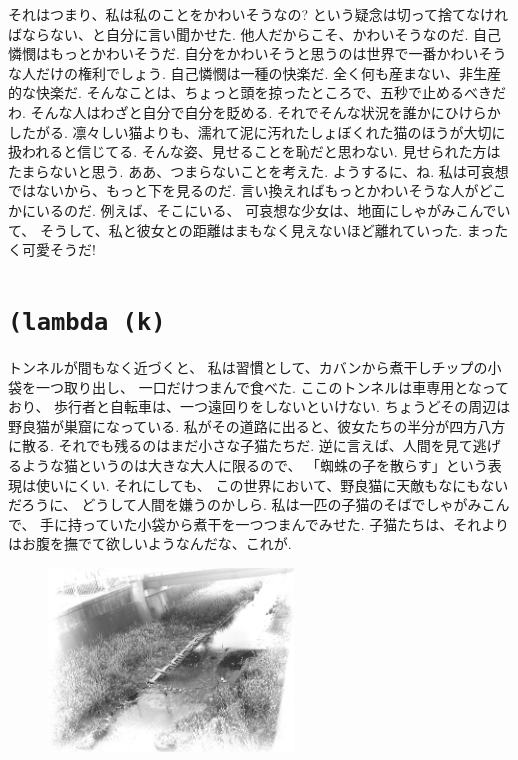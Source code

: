 それはつまり、私は私のことをかわいそうなの?
という疑念は切って捨てなければならない、と自分に言い聞かせた.
他人だからこそ、かわいそうなのだ. 自己憐憫はもっとかわいそうだ.
自分をかわいそうと思うのは世界で一番かわいそうな人だけの権利でしょう.
自己憐憫は一種の快楽だ. 全く何も産まない、非生産的な快楽だ.
そんなことは、ちょっと頭を掠ったところで、五秒で止めるべきだわ.
そんな人はわざと自分で自分を貶める.
それでそんな状況を誰かにひけらかしたがる.
凛々しい猫よりも、濡れて泥に汚れたしょぼくれた猫のほうが大切に扱われると信じてる.
そんな姿、見せることを恥だと思わない. 見せられた方はたまらないと思う.
ああ、つまらないことを考えた. ようするに、ね.
私は可哀想ではないから、もっと下を見るのだ.
言い換えればもっとかわいそうな人がどこかにいるのだ.
例えば、そこにいる、 可哀想な少女は、地面にしゃがみこんでいて、
そうして、私と彼女との距離はまもなく見えないほど離れていった.
まったく可愛そうだ!

\section*{\texttt{(lambda (k)}}

トンネルが間もなく近づくと、
私は習慣として、カバンから煮干しチップの小袋を一つ取り出し、
一口だけつまんで食べた.
ここのトンネルは車専用となっており、
歩行者と自転車は、一つ遠回りをしないといけない.
ちょうどその周辺は野良猫が巣窟になっている.
私がその道路に出ると、彼女たちの半分が四方八方に散る.
それでも残るのはまだ小さな子猫たちだ.
逆に言えば、人間を見て逃げるような猫というのは大きな大人に限るので、
「蜘蛛の子を散らす」という表現は使いにくい.
それにしても、
この世界において、野良猫に天敵もなにもないだろうに、
どうして人間を嫌うのかしら.
私は一匹の子猫のそばでしゃがみこんで、
手に持っていた小袋から煮干を一つつまんでみせた.
子猫たちは、それよりはお腹を撫でて欲しいようなんだな、これが.

\begin{figure}
  \includegraphics[width=0.58\textwidth,bb=0 0 1600 1200]{img/river.jpg}
\end{figure}

